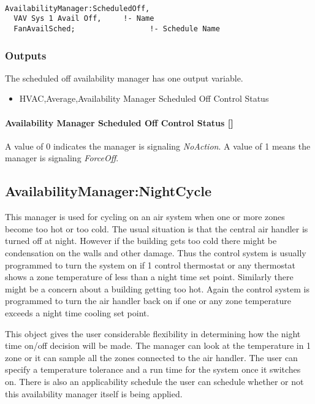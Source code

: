 \begin{lstlisting}

AvailabilityManager:ScheduledOff,
  VAV Sys 1 Avail Off,     !- Name
  FanAvailSched;                 !- Schedule Name
\end{lstlisting}

\subsubsection{Outputs}\label{outputs-1-027}

The scheduled off availability manager has one output variable.

\begin{itemize}
\tightlist
\item
  HVAC,Average,Availability Manager Scheduled Off Control Status
\end{itemize}

\paragraph{Availability Manager Scheduled Off Control Status {[]}}\label{availability-manager-scheduled-off-control-status}

A value of 0 indicates the manager is signaling \emph{NoAction}. A value of 1 means the manager is signaling \emph{ForceOff}.

\subsection{AvailabilityManager:NightCycle}\label{availabilitymanagernightcycle}

This manager is used for cycling on an air system when one or more zones become too hot or too cold. The usual situation is that the central air handler is turned off at night. However if the building gets too cold there might be condensation on the walls and other damage. Thus the control system is usually programmed to turn the system on if 1 control thermostat or any thermostat shows a zone temperature of less than a night time set point. Similarly there might be a concern about a building getting too hot. Again the control system is programmed to turn the air handler back on if one or any zone temperature exceeds a night time cooling set point.

This object gives the user considerable flexibility in determining how the night time on/off decision will be made. The manager can look at the temperature in 1 zone or it can sample all the zones connected to the air handler. The user can specify a temperature tolerance and a run time for the system once it switches on. There is also an applicability schedule the user can schedule whether or not this availability manager itself is being applied.

